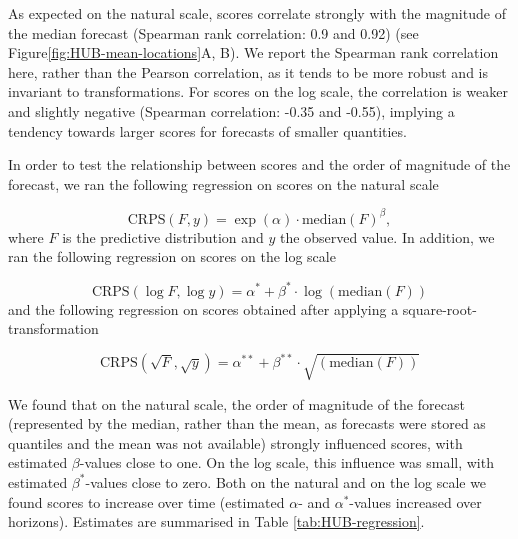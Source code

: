 \documentclass{article}
\begin{document}
As expected on the natural scale, scores correlate strongly with the magnitude of the median forecast (Spearman rank correlation: 0.9 and 0.92) (see Figure\ref{fig:HUB-mean-locations}A, B). We report the Spearman rank correlation here, rather than the Pearson correlation, as it tends to be more robust and is invariant to transformations. 
For scores on the log scale, the correlation is weaker and slightly negative (Spearman correlation: -0.35 and -0.55), implying a tendency towards larger scores for forecasts of smaller quantities. 

In order to test the relationship between scores and the order of magnitude of the forecast, we ran the following regression on scores on the natural scale

\begin{equation*}
    \text{CRPS}(F, y) = \exp(\alpha) \cdot \text{median}(F)^{\beta}, 
\end{equation*}
where $F$ is the predictive distribution and $y$ the observed value. In addition, we ran the following regression on scores on the log scale

\begin{equation*}
    \text{CRPS}(\log F, \log y) = \alpha^* + \beta^* \cdot \log{(\text{median}(F))}
\end{equation*} 
and the following regression on scores obtained after applying a square-root-transformation

\begin{equation*}
    \text{CRPS}(\sqrt{F}, \sqrt{y}) = \alpha^{**} + \beta^{**} \cdot \sqrt{(\text{median}(F))}
\end{equation*} 

We found that on the natural scale, the order of magnitude of the forecast (represented by the median, rather than the mean, as forecasts were stored as quantiles and the mean was not available) strongly influenced scores, with estimated $\beta$-values close to one. On the log scale, this influence was small, with estimated $\beta^*$-values close to zero. Both on the natural and on the log scale we found scores to increase over time (estimated $\alpha$- and $\alpha^*$-values increased over horizons). Estimates are summarised in Table \ref{tab:HUB-regression}. 
\end{document}
